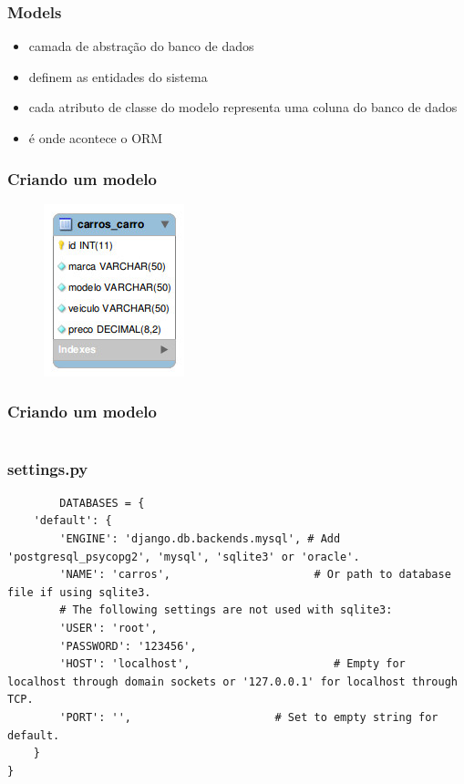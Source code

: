 \documentclass[aspectratio=169]{beamer}
\begin{document}
\begin{frame}\frametitle{Models}
\begin{itemize}
	\item camada de abstra\c c\~ao do banco de dados
	\item definem as entidades do sistema
	\item cada atributo de classe do modelo representa uma coluna do banco de dados
	\item \'e onde acontece o ORM
\end{itemize}
\end{frame}

\begin{frame}\frametitle{Criando um modelo}
	\begin{figure}[h]
	  \centering
  		\includegraphics[height=.4\paperheight]{figuras/relacionamentoCarro}
	\end{figure}
\end{frame}

\begin{frame}[fragile]\frametitle{Criando um modelo}
	\inputminted[bgcolor=green!10]{python}{carros_projeto/carros/models.py}
\end{frame}

\begin{frame}[fragile]\frametitle{settings.py}
	\begin{verbatim}
		DATABASES = {
    'default': {
        'ENGINE': 'django.db.backends.mysql', # Add 'postgresql_psycopg2', 'mysql', 'sqlite3' or 'oracle'.
        'NAME': 'carros',                      # Or path to database file if using sqlite3.
        # The following settings are not used with sqlite3:
        'USER': 'root',
        'PASSWORD': '123456',
        'HOST': 'localhost',                      # Empty for localhost through domain sockets or '127.0.0.1' for localhost through TCP.
        'PORT': '',                      # Set to empty string for default.
    }
}
	\end{verbatim}
\end{frame}
\end{document}
